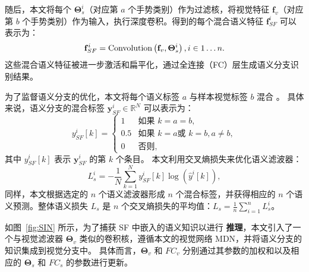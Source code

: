 随后，本文将每个 $\boldsymbol{\Theta}_{s}^i$（对应第 $a$ 个手势类别）作为过滤核，将视觉特征 $\mathbf{f}_{v}$（对应第 $b$ 个手势类别）作为输入，执行深度卷积。得到的每个混合语义特征 $\mathbf{f}_{SF}^i$ 可以表示为：
\begin{equation}
\mathbf{f}_{SF}^{i} = \text{Convolution}\left(\mathbf{f}_{v}, \boldsymbol{\Theta}_{s}^i\right),\quad i \in 1\dots n. \\
\end{equation}
这些混合语义特征被进一步激活和扁平化，通过全连接（FC）层生成语义分支识别结果。

为了监督语义分支的优化，本文将每个语义标签 $a$ 与样本视觉标签 $b$ 混合 \cite{zuo2023natural}。
具体来说，语义分支的混合标签 $\mathbf{y}_{SF}^i \in \mathbb{R}^N$ 可以表示为：
\begin{equation}
y_{SF}^i[k] = \begin{cases}
1 & \text{如果 } k = a = b,\\
0.5 & \text{如果 } k = a \text{或 } k = b, a\neq b,\\
0 & \text{否则,}
\end{cases}
\end{equation}
其中 $y_{SF}^i[k]$ 表示 $\mathbf{y}_{SF}^i$ 的第 $k$ 个条目。
本文利用交叉熵损失来优化语义滤波器：
\begin{equation}
L_{s}^i = -\frac{1}{N}\sum_{k=1}^{N}{{y}_{SF}^i[k] \log\left(\hat{y}^i[k]\right)},
\end{equation}
同样，本文根据选定的 $n$ 个语义滤波器形成 $n$ 个混合标签，并获得相应的 $n$ 个语义预测。整体语义损失 $L_{s}$ 是 $n$ 个交叉熵损失的平均值：$L_{s} = \frac{1}{n}\sum_{i=1}^{n}{L_{s}^i}$。

如图~\ref{fig:SIN} 所示，为了捕获 SF 中嵌入的语义知识以进行 \textbf{推理}，本文引入了一个与视觉滤波器 $\boldsymbol{\Theta}_{v}$ 类似的卷积核，遵循本文的视觉网络 MDN，并将语义分支的知识集成到视觉分支中。
具体而言，$\boldsymbol{\Theta}_{v}$ 和 $FC_{v}$ 分别通过其参数的加权和以及相应的 $\boldsymbol{\Theta}_{s}$ 和 $FC_{s}$ 的参数进行更新。


